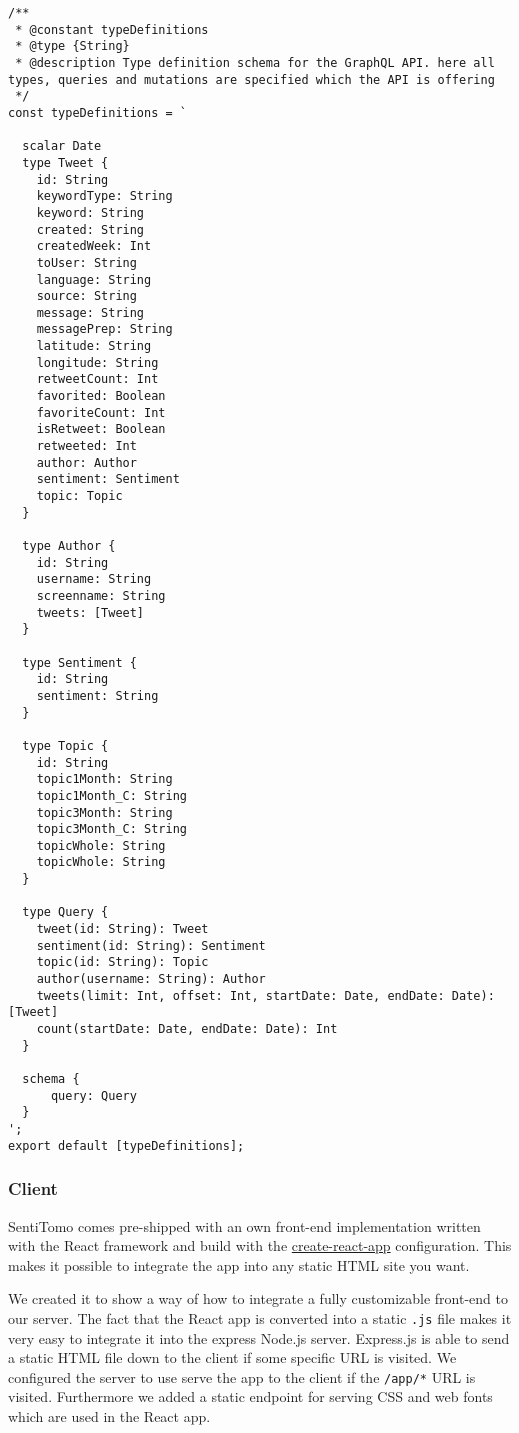 \documentclass[]{article}
\begin{document}
\begin{verbatim}
/**
 * @constant typeDefinitions
 * @type {String}
 * @description Type definition schema for the GraphQL API. here all types, queries and mutations are specified which the API is offering
 */
const typeDefinitions = `

  scalar Date
  type Tweet {
    id: String
    keywordType: String
    keyword: String
    created: String
    createdWeek: Int
    toUser: String
    language: String
    source: String
    message: String
    messagePrep: String
    latitude: String
    longitude: String
    retweetCount: Int
    favorited: Boolean
    favoriteCount: Int
    isRetweet: Boolean
    retweeted: Int
    author: Author
    sentiment: Sentiment
    topic: Topic
  }

  type Author {
    id: String
    username: String
    screenname: String
    tweets: [Tweet]
  }

  type Sentiment {
    id: String
    sentiment: String
  }

  type Topic {
    id: String
    topic1Month: String
    topic1Month_C: String
    topic3Month: String
    topic3Month_C: String
    topicWhole: String
    topicWhole: String
  }

  type Query {
    tweet(id: String): Tweet
    sentiment(id: String): Sentiment
    topic(id: String): Topic
    author(username: String): Author
    tweets(limit: Int, offset: Int, startDate: Date, endDate: Date): [Tweet]
    count(startDate: Date, endDate: Date): Int
  }

  schema {
      query: Query
  }
';
export default [typeDefinitions];
\end{verbatim}

\subsubsection{Client}\label{client}

SentiTomo comes pre-shipped with an own front-end implementation written
with the React framework and build with the
\href{https://github.com/facebookincubator/create-react-app}{create-react-app}
configuration. This makes it possible to integrate the app into any
static HTML site you want.

We created it to show a way of how to integrate a fully customizable
front-end to our server. The fact that the React app is converted into a
static \texttt{.js} file makes it very easy to integrate it into the
express Node.js server. Express.js is able to send a static HTML file
down to the client if some specific URL is visited. We configured the
server to use serve the app to the client if the \texttt{/app/*} URL is
visited. Furthermore we added a static endpoint for serving CSS and web
fonts which are used in the React app.
\end{document}
